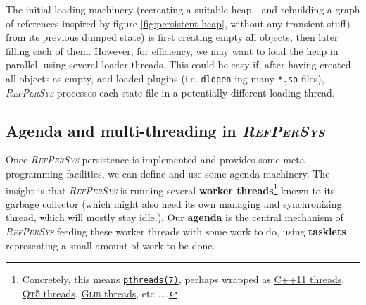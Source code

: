 \documentclass[11pt,a4paper,svgnames]{article}
\newcommand{\RefPerSys}{{\textit{\textsc{RefPerSys}}}}
\begin{document}
The initial loading machinery (recreating a suitable heap - and
rebuilding a graph of references inspired by figure
\ref{fig:persistent-heap}, without any transient stuff) from its
previous dumped state) is first creating empty all objects, then later
filling each of them. However, for efficiency, we may want to load the
heap in parallel, using several loader threads. This could be easy if,
after having created all objects as empty, and loaded plugins
(i.e. \texttt{dlopen}-ing many \texttt{*.so} files), {\RefPerSys}
processes each state file in a potentially different loading thread.

\bigskip

\subsection{Agenda and multi-threading in \RefPerSys}
\label{subsec:agenda-thread}

Once {\RefPerSys} persistence is implemented and provides some
meta-programming facilities, we can define and use some agenda
machinery. The insight is that {\RefPerSys} is running several
\cite{barney:2010:pthreads, butenhof:1997:programming} \textbf{worker
  threads}\footnote{Concretely, this means
\href{http://man7.org/linux/man-pages/man7/pthreads.7.html}{\texttt{pthreads(7)}},
perhaps wrapped as
\href{https://en.cppreference.com/w/cpp/thread}{\textsc{C++11}
  threads},
\href{https://doc.qt.io/qt-5/thread-basics.html}{\textsc{Qt5}
  threads},
\href{https://developer.gnome.org/glib/stable/glib-Threads.html}{\textsc{Glib}
  threads}, etc ....}  known to its garbage collector (which might
also need its own managing and synchronizing thread, which will mostly
stay idle.). Our \textbf{agenda}  is the central
mechanism of {\RefPerSys} feeding these worker threads with some work
to do, using \textbf{tasklets} representing a small amount of work to
be done.

\medskip
\end{document}
